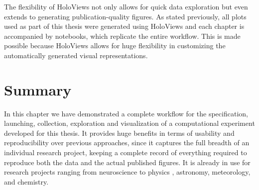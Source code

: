 The flexibility of HoloViews not only allows for quick data
exploration but even extends to generating publication-quality
figures. As stated previously, all plots used as part of this thesis
were generated using HoloViews and each chapter is accompanied by
notebooks, which replicate the entire workflow. This is made possible
because HoloViews allows for huge flexibility in customizing the
automatically generated visual representations.

\section{Summary}

In this chapter we have demonstrated a complete workflow for the
specification, launching, collection, exploration and visualization of
a computational experiment developed for this thesis. It provides huge
benefits in terms of usability and reproducibility over previous
approaches, since it captures the full breadth of an individual
research project, keeping a complete record of everything required to
reproduce both the data and the actual published figures.  It is
already in use for research projects ranging from
neuroscience \citep{Keemink2015} to physics \citep{Nijholt2015,
  Tenner2016}, astronomy, meteorology, and chemistry.

